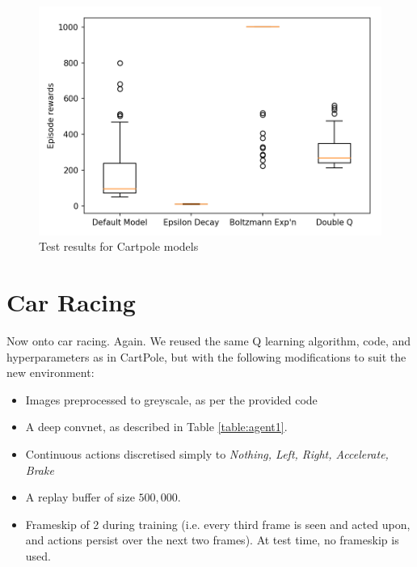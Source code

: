 \documentclass[a4paper, 11pt, conference]{ieeeconf}      %
\begin{document}
\begin{figure}
  \includegraphics[width=\linewidth]{figs/cartpole_test.png}
  \caption{Test results for Cartpole models}
  \label{fig:test0}
\end{figure}

\section{Car Racing}

Now onto car racing. Again. We reused the same Q learning algorithm, code, and hyperparameters as in CartPole, but with the following modifications to suit the new environment:

\begin{itemize}
	\item Images preprocessed to greyscale, as per the provided code

	\item A deep convnet, as described in Table \ref{table:agent1}.

  \item Continuous actions discretised simply to \textit{Nothing, Left, Right, Accelerate, Brake}

  \item A replay buffer of size $500,000$.

  \item Frameskip of 2 during training (i.e. every third frame is seen and acted upon, and actions persist over the next two frames). At test time, no frameskip is used.

\end{itemize}
\end{document}
